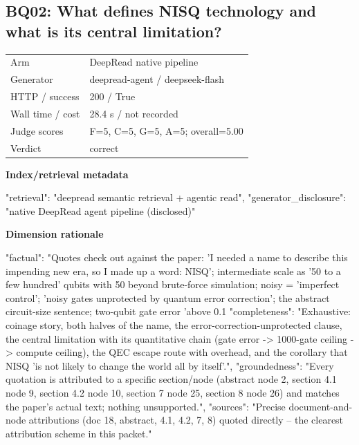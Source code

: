 \documentclass[10pt]{article}
\begin{document}
\subsection{BQ02: What defines NISQ technology and what is its central limitation?}
\begin{tabular}{@{}ll@{}}
Arm & DeepRead native pipeline\\
Generator & deepread-agent / deepseek-flash\\
HTTP / success & 200 / True\\
Wall time / cost & 28.4 s / not recorded\\
Judge scores & F=5, C=5, G=5, A=5; overall=5.00\\
Verdict & correct\\
\end{tabular}

\textbf{Index/retrieval metadata}
\begin{EvidenceText}
{
  "retrieval": "deepread semantic retrieval + agentic read",
  "generator_disclosure": "native DeepRead agent pipeline (disclosed)"
}
\end{EvidenceText}

\textbf{Dimension rationale}
\begin{EvidenceText}
{
  "factual": "Quotes check out against the paper: 'I needed a name to describe this impending new era, so I made up a word: NISQ'; intermediate scale as '50 to a few hundred' qubits with 50 beyond brute-force simulation; noisy = 'imperfect control'; 'noisy gates unprotected by quantum error correction'; the abstract circuit-size sentence; two-qubit gate error 'above 0.1%
  "completeness": "Exhaustive: coinage story, both halves of the name, the error-correction-unprotected clause, the central limitation with its quantitative chain (gate error -> 1000-gate ceiling -> compute ceiling), the QEC escape route with overhead, and the corollary that NISQ 'is not likely to change the world all by itself'.",
  "groundedness": "Every quotation is attributed to a specific section/node (abstract node 2, section 4.1 node 9, section 4.2 node 10, section 7 node 25, section 8 node 26) and matches the paper's actual text; nothing unsupported.",
  "sources": "Precise document-and-node attributions (doc 18, abstract, 4.1, 4.2, 7, 8) quoted directly -- the clearest attribution scheme in this packet."
}
\end{EvidenceText}
\end{document}
